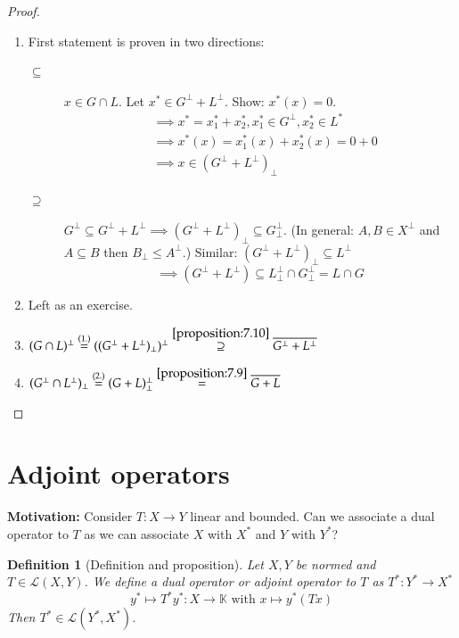 \documentclass[a4paper]{article}
\newcounter{lecref}[section]
\numberwithin{lecref}{section}
\newtheorem{definition}[lecref]{Definition}
\begin{document}
\begin{proof}
	\begin{enumerate}
		\item First statement is proven in two directions:
			\begin{description}
				\item[$\subseteq$] 
					$x \in G \cap L$. Let $x^* \in G^\bot + L^\bot$. Show: $x^*(x) = 0$.
					\begin{align*}
						&\implies x^* = x_1^* + x_2^*, x_1^* \in G^\bot, x_2^* \in L^* \\
						&\implies x^*(x) = x_1^*(x) + x_2^*(x) = 0 + 0 \\
						&\implies x \in (G^\bot + L^\bot)_\bot
					\end{align*}
				\item[$\supseteq$]
					$G^\bot \subseteq G^\bot + L^\bot \implies (G^\bot + L^\bot)_\bot \subseteq G^\bot_\bot$.
					(In general: $A, B \in X^\bot$ and $A \subseteq B$ then $B_\bot \leq A^\bot$.)
					Similar: $(G^\bot + L^\bot)_\bot \subseteq L^\bot$
					\[ \implies (G^\bot + L^\bot) \subseteq L^\bot_\bot \cap G^\bot_\bot = L \cap G \]
			\end{description}
		\item Left as an exercise.
		\item $(G \cap L)^\bot \overset{(1.)}{=} ((G^\bot + L^\bot)_\bot)^\bot \overset{\ref{proposition:7.10}}{\supseteq} \overline{G^\bot + L^\bot}$
		\item $(G^\bot \cap L^\bot)_\bot \overset{(2.)}{=} (G + L)^\bot_\bot \overset{\ref{proposition:7.9}}{=} \overline{G + L}$
	\end{enumerate}
\end{proof}

\section{Adjoint operators}

\textbf{Motivation:} Consider $T: X \to Y$ linear and bounded. Can we associate a dual operator to $T$ as we can associate $X$ with $X^*$ and $Y$ with $Y^*$?

\begin{definition}[Definition and proposition]
	\label{definition:7.11}
	Let $X, Y$ be normed and $T \in \mathcal L(X, Y)$.
	We define a \emph{dual operator} or \emph{adjoint operator} to $T$ as $T^*: Y^* \to X^*$
	\[ y^* \mapsto T^* y^*: X \to \mathbb K \text{ with } x \mapsto y^*(Tx) \]
	Then $T^* \in \mathcal L(Y^*, X^*)$.
\end{definition}
\end{document}
